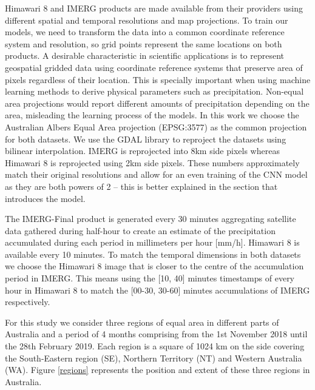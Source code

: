 \documentclass[3p,times]{elsarticle}
\begin{document}
Himawari 8 and IMERG products are made available from their providers using different spatial and temporal resolutions and map projections. To train our models, we need to transform the data into a common coordinate reference system and resolution, so grid points represent the same locations on both products. A desirable characteristic in scientific applications is to represent geospatial gridded data using coordinate reference systems that preserve area of pixels regardless of their location. This is specially important when using machine learning methods to derive physical parameters such as precipitation. Non-equal area projections would report different amounts of precipitation depending on the area, misleading the learning process of the models. In this work we choose the Australian Albers Equal Area projection (EPSG:3577) as the common projection for both datasets. We use the GDAL library \citep{warmerdam2008geospatial} to reproject the datasets using bilinear interpolation. IMERG is reprojected into 8km side pixels whereas Himawari 8 is reprojected using 2km side pixels. These numbers approximately match their original resolutions and allow for an even training of the CNN model as they are both powers of 2 -- this is better explained in the section that introduces the model.

The IMERG-Final product is generated every 30 minutes aggregating satellite data gathered during half-hour to create an estimate of the precipitation accumulated during each period in millimeters per hour [mm/h]. Himawari 8 is available every 10 minutes. To match the temporal dimensions in both datasets we choose the Himawari 8 image that is closer to the centre of the accumulation period in IMERG. This means using the [10, 40] minutes timestamps of every hour in Himawari 8 to match the [00-30, 30-60] minutes accumulations of IMERG respectively.

For this study we consider three regions of equal area in different parts of Australia and a period of 4 months comprising from the 1st November 2018 until the 28th February 2019. Each region is a square of 1024 km on the side covering the South-Eastern region (SE), Northern Territory (NT) and Western Australia (WA). Figure \ref{regions} represents the position and extent of these three regions in Australia.
\end{document}
